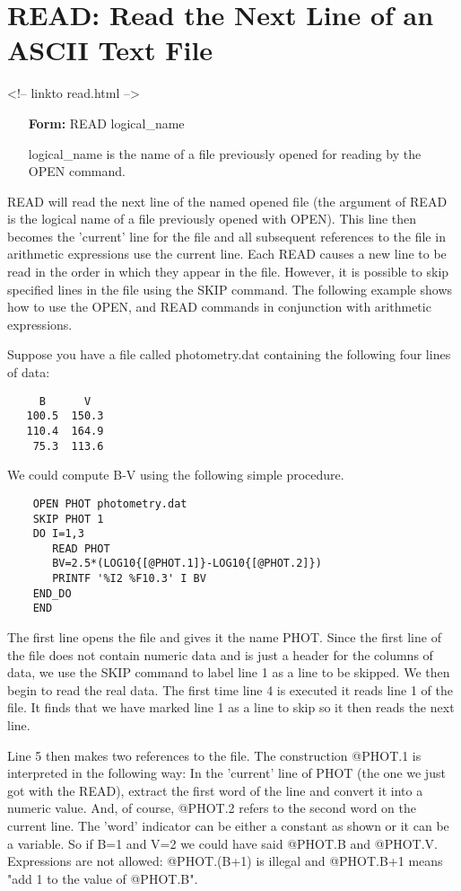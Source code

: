 \section{READ: Read the Next Line of an ASCII Text File}
\begin{rawhtml}
<!-- linkto read.html -->
\end{rawhtml}
\begin{itemize}
  \item[\textbf{Form: }READ logical\_name\hfill]{}
  \item[logical\_name]{is the name of a file previously
       opened for reading by the OPEN command.}
\end{itemize}

READ will read the next line of the named opened file (the argument of READ
is the logical name of a file previously opened with OPEN).  This line then
becomes the 'current' line for the file and all subsequent references to
the file in arithmetic expressions use the current line.  Each READ causes
a new line to be read in the order in which they appear in the file.
However, it is possible to skip specified lines in the file using the SKIP
command. The following example shows how to use the OPEN, and READ commands
in conjunction with arithmetic expressions.

Suppose you have a file called photometry.dat containing the following four
lines of data:
\begin{verbatim}
     B      V
   100.5  150.3
   110.4  164.9
    75.3  113.6
\end{verbatim}
We could compute B-V using the following simple procedure.
\begin{verbatim}
    OPEN PHOT photometry.dat
    SKIP PHOT 1
    DO I=1,3
       READ PHOT
       BV=2.5*(LOG10{[@PHOT.1]}-LOG10{[@PHOT.2]})
       PRINTF '%I2 %F10.3' I BV
    END_DO
    END
\end{verbatim}
The first line opens the file and gives it the name PHOT.  Since the first
line of the file does not contain numeric data and is just a header for the
columns of data, we use the SKIP command to label line 1 as a line to be
skipped.  We then begin to read the real data. The first time line 4 is
executed it reads line 1 of the file.  It finds that we have marked line 1
as a line to skip so it then reads the next line.

Line 5 then makes two references to the file.  The construction @PHOT.1 is
interpreted in the following way: In the 'current' line of PHOT (the one we
just got with the READ), extract the first word of the line and convert it
into a numeric value.  And, of course, @PHOT.2 refers to the second word on
the current line.  The 'word' indicator can be either a constant as shown
or it can be a variable. So if B=1 and V=2 we could have said @PHOT.B and
@PHOT.V.  Expressions are not allowed: @PHOT.(B+1) is illegal and @PHOT.B+1
means "add 1 to the value of @PHOT.B".

